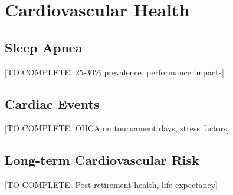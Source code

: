 \section{Cardiovascular Health}

\subsection{Sleep Apnea}

[TO COMPLETE: 25-30\% prevalence, performance impacts]

\subsection{Cardiac Events}

[TO COMPLETE: OHCA on tournament days, stress factors]

\subsection{Long-term Cardiovascular Risk}

[TO COMPLETE: Post-retirement health, life expectancy]